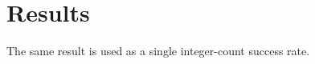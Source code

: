 \documentclass{article}
\begin{document}
\begin{abstract}
The evaluation reports 83.3\% success with N=7 samples.
\end{abstract}
\section{Results}
The same result is used as a single integer-count success rate.
\end{document}
